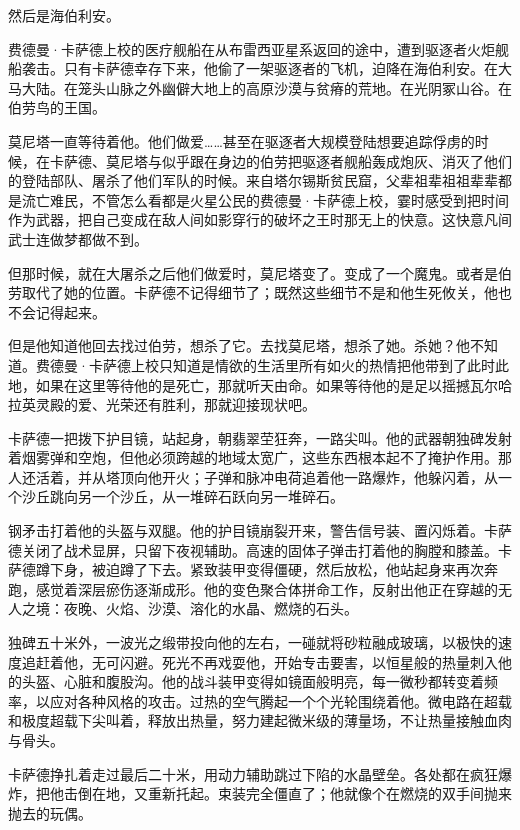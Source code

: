 \documentclass[AutoFakeBold=true]{book}
\begin{document}
然后是海伯利安。

费德曼·卡萨德上校的医疗舰船在从布雷西亚星系返回的途中，遭到驱逐者火炬舰船袭击。只有卡萨德幸存下来，他偷了一架驱逐者的飞机，迫降在海伯利安。在大马大陆。在笼头山脉之外幽僻大地上的高原沙漠与贫瘠的荒地。在光阴冢山谷。在伯劳鸟的王国。

莫尼塔一直等待着他。他们做爱……甚至在驱逐者大规模登陆想要追踪俘虏的时候，在卡萨德、莫尼塔与似乎跟在身边的伯劳把驱逐者舰船轰成炮灰、消灭了他们的登陆部队、屠杀了他们军队的时候。来自塔尔锡斯贫民窟，父辈祖辈祖祖辈辈都是流亡难民，不管怎么看都是火星公民的费德曼·卡萨德上校，霎时感受到把时间作为武器，把自己变成在敌人间如影穿行的破坏之王时那无上的快意。这快意凡间武士连做梦都做不到。

但那时候，就在大屠杀之后他们做爱时，莫尼塔变了。变成了一个魔鬼。或者是伯劳取代了她的位置。卡萨德不记得细节了；既然这些细节不是和他生死攸关，他也{\kaishu 不会}记得起来。

但是他知道他回去找过伯劳，想杀了它。去找莫尼塔，想杀了她。杀她？他不知道。费德曼·卡萨德上校只知道是情欲的生活里所有如火的热情把他带到了此时此地，如果在这里等待他的是死亡，那就听天由命。如果等待他的是足以摇撼瓦尔哈拉英灵殿的爱、光荣还有胜利，那就迎接现状吧。

\vspace*{1em}

卡萨德一把拨下护目镜，站起身，朝翡翠茔狂奔，一路尖叫。他的武器朝独碑发射着烟雾弹和空炮，但他必须跨越的地域太宽广，这些东西根本起不了掩护作用。那人还活着，并从塔顶向他开火；子弹和脉冲电荷追着他一路爆炸，他躲闪着，从一个沙丘跳向另一个沙丘，从一堆碎石跃向另一堆碎石。

钢矛击打着他的头盔与双腿。他的护目镜崩裂开来，警告信号装、置闪烁着。卡萨德关闭了战术显屏，只留下夜视辅助。高速的固体子弹击打着他的胸膛和膝盖。卡萨德蹲下身，被迫蹲了下去。紧致装甲变得僵硬，然后放松，他站起身来再次奔跑，感觉着深层瘀伤逐渐成形。他的变色聚合体拼命工作，反射出他正在穿越的无人之境：夜晚、火焰、沙漠、溶化的水晶、燃烧的石头。

独碑五十米外，一波光之缎带投向他的左右，一碰就将砂粒融成玻璃，以极快的速度追赶着他，无可闪避。死光不再戏耍他，开始专击要害，以恒星般的热量刺入他的头盔、心脏和腹股沟。他的战斗装甲变得如镜面般明亮，每一微秒都转变着频率，以应对各种风格的攻击。过热的空气腾起一个个光轮围绕着他。微电路在超载和极度超载下尖叫着，释放出热量，努力建起微米级的薄量场，不让热量接触血肉与骨头。

卡萨德挣扎着走过最后二十米，用动力辅助跳过下陷的水晶壁垒。各处都在疯狂爆炸，把他击倒在地，又重新托起。束装完全僵直了；他就像个在燃烧的双手间抛来抛去的玩偶。
\end{document}
